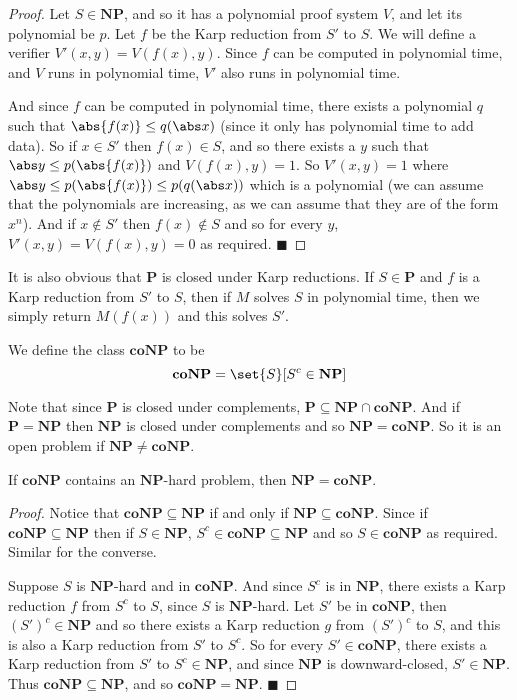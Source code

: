 \documentclass[10pt]{article}
\def\P{\mathbf{P}}
\def\NP{\mathbf{NP}}
\def\coNP{\mathbf{coNP}}
\def\qed{%
    \ifmmode%
        \eqno\blacksquare%
    \else%
        \hskip1cm\allowbreak\hbox{}\nobreak\hfill$\blacksquare$%
    \fi%
}
\begin{document}
\begin{proof}

    Let $S\in\NP$, and so it has a polynomial proof system $V$, and let its polynomial be $p$.
    Let $f$ be the Karp reduction from $S'$ to $S$.
    We will define a verifier $V'(x,y)=V(f(x),y)$.
    Since $f$ can be computed in polynomial time, and $V$ runs in polynomial time, $V'$ also runs in polynomial time.

    And since $f$ can be computed in polynomial time, there exists a polynomial $q$ such that $\abs{f(x)}\leq q(\abs x)$ (since it only has polynomial time to add data).
    So if $x\in S'$ then $f(x)\in S$, and so there exists a $y$ such that $\abs y\leq p(\abs{f(x)})$ and $V(f(x),y)=1$.
    So $V'(x,y)=1$ where $\abs y\leq p(\abs{f(x)})\leq p(q(\abs x))$ which is a polynomial (we can assume that the polynomials are increasing, as we can assume that they are of the form $x^n$).
    And if $x\notin S'$ then $f(x)\notin S$ and so for every $y$, $V'(x,y)=V(f(x),y)=0$ as required.
    \qed

\end{proof}

It is also obvious that $\P$ is closed under Karp reductions.
If $S\in\P$ and $f$ is a Karp reduction from $S'$ to $S$, then if $M$ solves $S$ in polynomial time, then we simply return $M(f(x))$ and this solves $S'$.

\begin{defn*}

    We define the class $\coNP$ to be
    \[ \coNP = \set{S}[S^c\in\NP] \]

\end{defn*}

Note that since $\P$ is closed under complements, $\P\subseteq\NP\cap\coNP$.
And if $\P=\NP$ then $\NP$ is closed under complements and so $\NP=\coNP$.
So it is an open problem if $\NP\neq\coNP$.

\begin{prop*}

    If $\coNP$ contains an $\NP$-hard problem, then $\NP=\coNP$.

\end{prop*}

\begin{proof}

    Notice that $\coNP\subseteq\NP$ if and only if $\NP\subseteq\coNP$.
    Since if $\coNP\subseteq\NP$ then if $S\in\NP$, $S^c\in\coNP\subseteq\NP$ and so $S\in\coNP$ as required.
    Similar for the converse.

    Suppose $S$ is $\NP$-hard and in $\coNP$.
    And since $S^c$ is in $\NP$, there exists a Karp reduction $f$ from $S^c$ to $S$, since $S$ is $\NP$-hard.
    Let $S'$ be in $\coNP$, then $(S')^c\in\NP$ and so there exists a Karp reduction $g$ from $(S')^c$ to $S$, and this is also a Karp reduction from $S'$ to $S^c$.
    So for every $S'\in\coNP$, there exists a Karp reduction from $S'$ to $S^c\in\NP$, and since $\NP$ is downward-closed, $S'\in\NP$.
    Thus $\coNP\subseteq\NP$, and so $\coNP=\NP$.
    \qed

\end{proof}
\end{document}

